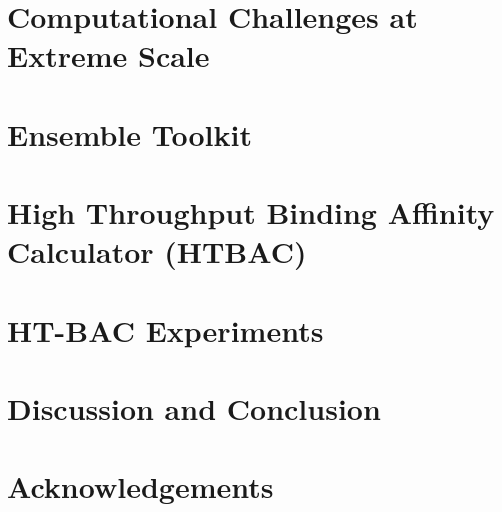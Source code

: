 \documentclass[conference]{IEEEtran}
\begin{document}
\section{Computational Challenges at Extreme Scale}\label{sec:3}





\section{Ensemble Toolkit}\label{sec:4}






\section{High Throughput Binding Affinity Calculator (HTBAC)}\label{sec:5}



\section{HT-BAC Experiments}\label{sec:6}



\section{Discussion and Conclusion}\label{sec:conclusion}



\section*{Acknowledgements}





\end{document}
